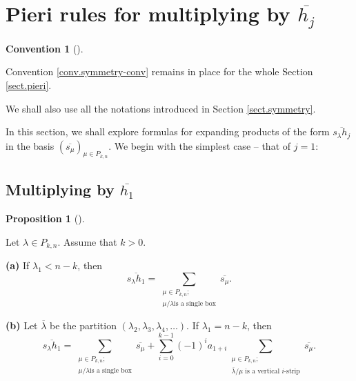 \documentclass[numbers=enddot,12pt,final,onecolumn,notitlepage]{scrartcl}%
\theoremstyle{definition}
\newtheorem{prop}[theo]{Proposition}
\newenvironment{proposition}[1][]
{\begin{prop}[#1]\begin{leftbar}}
{\end{leftbar}\end{prop}}
\newtheorem{conv}[theo]{Convention}
\newenvironment{convention}[1][]
{\begin{conv}[#1]\begin{leftbar}}
{\end{leftbar}\end{conv}}
\newenvironment{convention}[1][Convention]{\noindent\textbf{#1.} }{\ \rule{0.5em}{0.5em}}
\newenvironment{convention}[1][Convention]{\noindent\textbf{#1.} }{\ \rule{0.5em}{0.5em}}
\let\sumnonlimits\sum
\renewcommand{\sum}{\sumnonlimits\limits}
\begin{document}
\section{\label{sect.pieri}Pieri rules for multiplying by $\overline{h_{j}}$}

\begin{convention}
Convention \ref{conv.symmetry-conv} remains in place for the whole Section
\ref{sect.pieri}.

We shall also use all the notations introduced in Section \ref{sect.symmetry}.
\end{convention}

In this section, we shall explore formulas for expanding products of the form
$\overline{s_{\lambda}h_{j}}$ in the basis $\left(  \overline{s_{\mu}}\right)
_{\mu\in P_{k,n}}$. We begin with the simplest case -- that of $j=1$:

\subsection{Multiplying by $\overline{h_{1}}$}

\begin{proposition}
\label{prop.pieri-h1}Let $\lambda\in P_{k,n}$. Assume that $k>0$.

\textbf{(a)} If $\lambda_{1}<n-k$, then%
\[
\overline{s_{\lambda}h_{1}}=\sum_{\substack{\mu\in P_{k,n};\\\mu/\lambda\text{
is a single box}}}\overline{s_{\mu}}.
\]


\textbf{(b)} Let $\overline{\lambda}$ be the partition $\left(  \lambda
_{2},\lambda_{3},\lambda_{4},\ldots\right)  $. If $\lambda_{1}=n-k$, then%
\[
\overline{s_{\lambda}h_{1}}=\sum_{\substack{\mu\in P_{k,n};\\\mu/\lambda\text{
is a single box}}}\overline{s_{\mu}}+\sum_{i=0}^{k-1}\left(  -1\right)
^{i}a_{1+i}\sum_{\substack{\mu\in P_{k,n};\\\overline{\lambda}/\mu\text{ is a
vertical }i\text{-strip}}}\overline{s_{\mu}}.
\]

\end{proposition}
\end{document}
